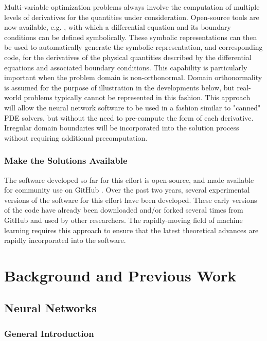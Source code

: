 \documentclass{article}
\begin{document}
Multi-variable optimization problems always involve the computation of multiple levels of derivatives for the quantities under consideration. Open-source tools are now available, e.g. \cite{sympy}, with which a differential equation and its boundary conditions can be defined symbolically. These symbolic representations can then be used to automatically generate the symbolic representation, and corresponding code, for the derivatives of the physical quantities described by the differential equations and associated boundary conditions. This capability is particularly important when the problem domain is non-orthonormal. Domain orthonormality is assumed for the purpose of illustration in the developments below, but real-world problems typically cannot be represented in this fashion. This approach will allow the neural network software to be used in a fashion similar to "canned" PDE solvers, but without the need to pre-compute the form of each derivative. Irregular domain boundaries will be incorporated into the solution process without requiring additional precomputation.

\subsubsection{Make the Solutions Available}

The software developed so far for this effort \cite{nnode} is open-source, and made available for community use on GitHub \cite{github}. Over the past two years, several experimental versions of the software for this effort have been developed. These early versions of the code have already been downloaded and/or forked several times from GitHub and used by other researchers. The rapidly-moving field of machine learning requires this approach to ensure that the latest theoretical advances are rapidly incorporated into the software.


\newpage

\section{Background and Previous Work}

\subsection{Neural Networks}

\subsubsection{General Introduction}
\end{document}
